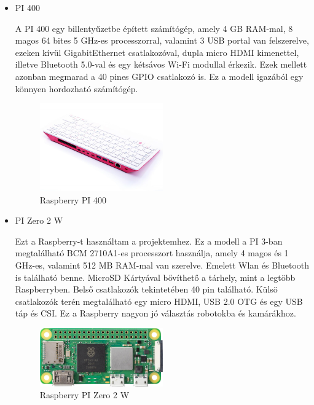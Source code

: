 \documentclass[a4paper,12pt,oneside]{report}
\begin{document}
\begin{itemize}
	\item{PI 400}

	A PI 400 egy billentyűzetbe épített számítógép, amely 4 GB RAM-mal, 8 magos 64 bites 5 GHz-es processzorral, valamint 3 USB portal 
	van felszerelve, ezeken kívül GigabitEthernet csatlakozóval, dupla micro HDMI kimenettel, illetve Bluetooth 5.0-val és 
	egy kétsávos Wi-Fi modullal érkezik. Ezek mellett azonban megmarad a 40 pines GPIO csatlakozó is.
	Ez a modell igazából egy könnyen hordozható számítógép.
	\begin{figure}[htbp]
		\centering
		\includegraphics[width=0.5\textwidth]{fig/pi400.png}
		\caption{Raspberry PI 400}
		\label{fig-pi400}
	\end{figure}

	\item{PI Zero 2 W}

	Ezt a Raspberry-t használtam a projektemhez.
	Ez a modell a PI 3-ban megtalálható BCM 2710A1-es processzort használja, amely 4 magos és 1 GHz-es, valamint 512 MB RAM-mal 
	van szerelve.
	Emelett Wlan és Bluetooth is található benne. MicroSD Kártyával bővíthető a tárhely, mint a legtöbb Raspberryben.
	Belső csatlakozók tekintetében 40 pin található.
	Külsö csatlakozók terén megtalálható egy micro HDMI, USB 2.0 OTG és egy USB táp és CSI.
	Ez a Raspberry nagyon jó választás robotokba és kamárákhoz.
	\begin{figure}[htbp]
		\centering
		\includegraphics[width=0.5\textwidth]{fig/pi0.png}
		\caption{Raspberry PI Zero 2 W}
		\label{fig-pi0}
	\end{figure}


\end{itemize}
\end{document}
